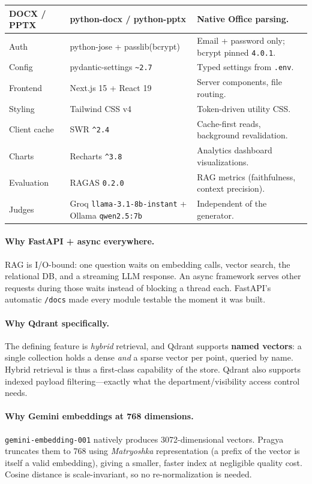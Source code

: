\documentclass[11pt,a4paper,oneside]{report}
\newcommand{\code}[1]{\texttt{#1}}
\begin{document}
\begin{table}[htbp]
\begin{tabularx}{\linewidth}{|L{2.6cm}|L{4.2cm}|X|}
DOCX / PPTX & python-docx / python-pptx & Native Office parsing.\\ \hline
Auth & python-jose + passlib(bcrypt) & Email + password only; bcrypt pinned \code{4.0.1}.\\ \hline
Config & pydantic-settings \code{\textasciitilde2.7} & Typed settings from \code{.env}.\\ \hline
Frontend & Next.js 15 + React 19 & Server components, file routing.\\ \hline
Styling & Tailwind CSS v4 & Token-driven utility CSS.\\ \hline
Client cache & SWR \code{\textasciicircum2.4} & Cache-first reads, background revalidation.\\ \hline
Charts & Recharts \code{\textasciicircum3.8} & Analytics dashboard visualizations.\\ \hline
Evaluation & RAGAS \code{0.2.0} & RAG metrics (faithfulness, context precision).\\ \hline
Judges & Groq \code{llama-3.1-8b-instant} + Ollama \code{qwen2.5:7b} & Independent of the generator.\\ \hline
\end{tabularx}
\end{table}

\paragraph{Why FastAPI + async everywhere.} RAG is I/O-bound: one question waits on embedding
calls, vector search, the relational DB, and a streaming LLM response. An async framework
serves other requests during those waits instead of blocking a thread each. FastAPI's automatic
\code{/docs} made every module testable the moment it was built.

\paragraph{Why Qdrant specifically.} The defining feature is \emph{hybrid} retrieval, and Qdrant
supports \textbf{named vectors}: a single collection holds a dense \emph{and} a sparse vector per
point, queried by name. Hybrid retrieval is thus a first-class capability of the store. Qdrant
also supports indexed payload filtering---exactly what the department/visibility access control
needs.

\paragraph{Why Gemini embeddings at 768 dimensions.} \code{gemini-embedding-001} natively produces
3072-dimensional vectors. Pragya truncates them to 768 using \emph{Matryoshka} representation (a
prefix of the vector is itself a valid embedding), giving a smaller, faster index at negligible
quality cost. Cosine distance is scale-invariant, so no re-normalization is needed.
\end{document}
